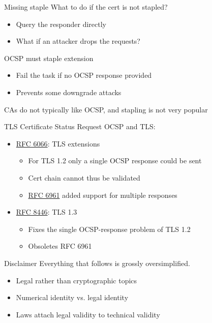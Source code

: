 \begin{frame}{Missing staple}
  \pause
  What to do if the cert is not stapled?
  \begin{itemize}[<+(1)->]
    \item Query the responder directly
    \item What if an attacker drops the requests?
  \end{itemize}
  
  \pause
  OCSP must staple extension
  \begin{itemize}[<+(1)->]
    \item Fail the task if no OCSP response provided
    \item Prevents some downgrade attacks
  \end{itemize}

  \pause
  CAs do not typically like OCSP, and stapling is not very popular
\end{frame}

\begin{frame}{TLS Certificate Status Request}
  OCSP and TLS:
  \begin{itemize}[<+(1)->]
    \pause \item \href{https://datatracker.ietf.org/doc/html/rfc6066}{RFC 6066}: TLS extensions
    \begin{itemize}
      \item For TLS 1.2 only a single OCSP response could be sent
      \item Cert chain cannot thus be validated
      \item \href{https://datatracker.ietf.org/doc/html/rfc6961}{RFC 6961} added support for multiple responses
    \end{itemize}
    \pause \item \href{https://datatracker.ietf.org/doc/html/rfc8446}{RFC 8446}: TLS 1.3
    \begin{itemize}
      \item Fixes the single OCSP-response problem of TLS 1.2
      \item Obsoletes RFC 6961
    \end{itemize}
  \end{itemize}
\end{frame}

\begin{frame}{Disclaimer}
  Everything that follows is grossly oversimplified.
  \pause
  \begin{itemize}
    \item Legal rather than cryptographic topics
    \item Numerical identity vs. legal identity
    \item Laws attach legal validity to technical validity
  \end{itemize}
\end{frame}


